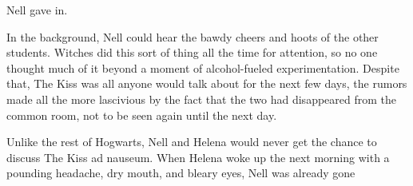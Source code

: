 Nell gave in.

In the background, Nell could hear the bawdy cheers and hoots of the other students. Witches did this sort of thing all the time for attention, so no one thought much of it beyond a moment of alcohol-fueled experimentation. Despite that, The Kiss was all anyone would talk about for the next few days, the rumors made all the more lascivious by the fact that the two had disappeared from the common room, not to be seen again until the next day.

Unlike the rest of Hogwarts, Nell and Helena would never get the chance to discuss The Kiss ad nauseum. When Helena woke up the next morning with a pounding headache, dry mouth, and bleary eyes, Nell was already gone


